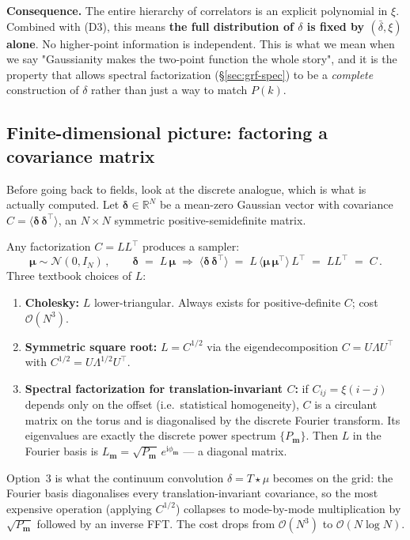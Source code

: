 \documentclass[12pt]{article}
\newcommand{\bm}{\mathbf{m}}
\begin{document}
\textbf{Consequence.}  The entire hierarchy of correlators is an
explicit polynomial in $\xi$.  Combined with (D3), this means
\textbf{the full distribution of $\delta$ is fixed by $(\bar\delta,
\xi)$ alone}.  No higher-point information is independent.  This
is what we mean when we say "Gaussianity makes the two-point
function the whole story", and it is the property that allows
spectral factorization (\S\ref{sec:grf-spec}) to be a
\emph{complete} construction of $\delta$ rather than just a way
to match $P(k)$.

\subsection{Finite-dimensional picture: factoring a covariance matrix}
\label{sec:grf-discrete}

Before going back to fields, look at the discrete analogue, which
is what is actually computed.  Let $\boldsymbol\delta \in
\mathbb{R}^N$ be a mean-zero Gaussian vector with covariance
$C = \langle\boldsymbol\delta\,\boldsymbol\delta^\top\rangle$,
an $N\times N$ symmetric positive-semidefinite matrix.

Any factorization $C = L L^\top$ produces a sampler:
\begin{equation}
  \boldsymbol\mu \sim \mathcal{N}(0, I_N)\,, \qquad
  \boldsymbol\delta \;=\; L\,\boldsymbol\mu
  \;\Longrightarrow\;
  \langle\boldsymbol\delta\,\boldsymbol\delta^\top\rangle
  \;=\; L\,\langle\boldsymbol\mu\,\boldsymbol\mu^\top\rangle\,L^\top
  \;=\; L L^\top \;=\; C\,.
  \label{eq:grf-factor}
\end{equation}
Three textbook choices of $L$:
\begin{enumerate}
  \item \textbf{Cholesky:} $L$ lower-triangular.  Always exists for
        positive-definite $C$; cost $\mathcal{O}(N^3)$.
  \item \textbf{Symmetric square root:} $L = C^{1/2}$ via the
        eigendecomposition $C = U \Lambda U^\top$ with
        $C^{1/2} = U \Lambda^{1/2} U^\top$.
  \item \textbf{Spectral factorization for translation-invariant
        $C$:} if $C_{ij} = \xi(i - j)$ depends only on the offset
        (i.e.\ statistical homogeneity), $C$ is a circulant matrix
        on the torus and is diagonalised by the discrete Fourier
        transform.  Its eigenvalues are exactly the discrete power
        spectrum $\{P_\bm\}$.  Then $L$ in the Fourier basis is
        $L_\bm = \sqrt{P_\bm}\,e^{\mathrm i\phi_\bm}$ --- a
        diagonal matrix.
\end{enumerate}
Option~3 is what the continuum convolution $\delta = T\star\mu$
becomes on the grid: the Fourier basis diagonalises every
translation-invariant covariance, so the most expensive operation
(applying $C^{1/2}$) collapses to mode-by-mode multiplication by
$\sqrt{P_\bm}$ followed by an inverse FFT.  The cost drops from
$\mathcal{O}(N^3)$ to $\mathcal{O}(N \log N)$.
\end{document}
